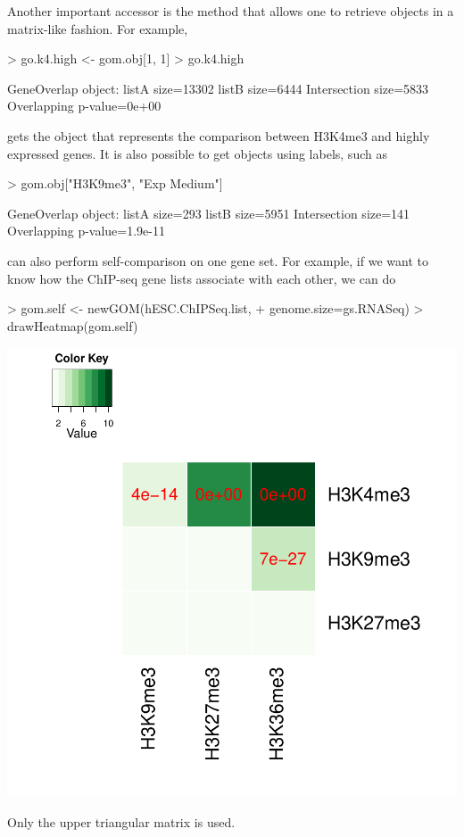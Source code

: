 \documentclass{article}
\begin{document}
Another important accessor is the method \Rfunction{"["} that allows one to retrieve  objects in a matrix-like fashion. For example,
\begin{Schunk}
\begin{Sinput}
> go.k4.high <- gom.obj[1, 1]
> go.k4.high
\end{Sinput}
\begin{Soutput}
GeneOverlap object:
listA size=13302
listB size=6444
Intersection size=5833
Overlapping p-value=0e+00
\end{Soutput}
\end{Schunk}
gets the  object that represents the comparison between H3K4me3 and highly expressed genes. It is also possible to get  objects using labels, such as
\begin{Schunk}
\begin{Sinput}
> gom.obj["H3K9me3", "Exp Medium"]
\end{Sinput}
\begin{Soutput}
GeneOverlap object:
listA size=293
listB size=5951
Intersection size=141
Overlapping p-value=1.9e-11
\end{Soutput}
\end{Schunk}

 can also perform self-comparison on one gene set. For example, if we want to know how the ChIP-seq gene lists associate with each other, we can do
\begin{Schunk}
\begin{Sinput}
> gom.self <- newGOM(hESC.ChIPSeq.list, 
+                    genome.size=gs.RNASeq)
> drawHeatmap(gom.self)
\end{Sinput}
\end{Schunk}
\includegraphics{GeneOverlap-019}
\begin{flushleft}
Only the upper triangular matrix is used.
\end{flushleft}
\end{document}
